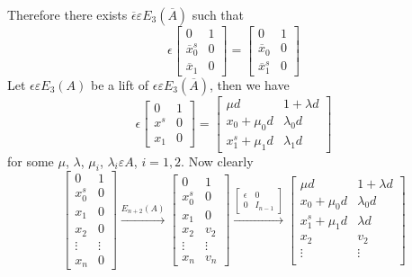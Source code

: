 \begin{Proof}
Therefore there exists $\overline{\epsilon} \varepsilon
E_3(\overline{A})$ such that 
$$
\epsilon
\begin{bmatrix}
0 &1\\
\overline{x}^{s}_0 & 0\\
\overline{x}_1 & 0
\end{bmatrix} = \begin{bmatrix}
0 & 1\\
\overline{x}_0 & 0\\
\overline{x}^{s}_1 & 0
\end{bmatrix}
$$
Let $\epsilon \varepsilon E_3(A)$ be a lift of $\epsilon \varepsilon
E_3(\overline{A})$, then we have 
$$
\epsilon
\begin{bmatrix}
0 & 1\\
x^{s} & 0\\
x_1 & 0
\end{bmatrix} = \begin{bmatrix}
\mu d & 1+\lambda d\\
x_0+\mu_0d & \lambda_0d\\
x^{s}_1+\mu_1d & \lambda_1d
\end{bmatrix}
$$
for some $\mu$, $\lambda$, $\mu_i$, $\lambda_i\varepsilon A$, $i=1,
2$. Now clearly
$$
\begin{bmatrix}
0 & 1\\
x^{s}_0 & 0\\
x_1 & 0\\
x_2 & 0\\
\vdots & \vdots\\
x_n & 0
\end{bmatrix} \xrightarrow{E_{n+2}(A)} \begin{bmatrix}
0 &1\\
x^{s}_0 & 0\\
x_1 & 0\\
x_2 & v_2\\
\vdots & \vdots\\
x_n & v_n
\end{bmatrix} \xrightarrow{\begin{bmatrix} 
\epsilon & 0\\
0 & I_{n-1}
  \end{bmatrix}}
  \begin{bmatrix}
\mu d & 1+\lambda d\\
x_0+\mu_0d & \lambda_0 d\\
x^{s}_1+\mu_1d & \lambda d\\
x_2 & v_2\\
\vdots & \vdots\\

\end{bmatrix}$$
\end{Proof}
